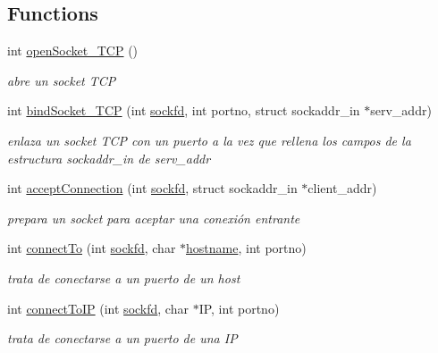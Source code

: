 \subsection*{Functions}
\begin{DoxyCompactItemize}
\item 
int \hyperlink{_g-2301-05-_p1-socket_8h_ac0a294efde364937332533e4ecd8d121}{open\-Socket\-\_\-\-T\-C\-P} ()
\begin{DoxyCompactList}\small\item\em abre un socket T\-C\-P \end{DoxyCompactList}\item 
int \hyperlink{_g-2301-05-_p1-socket_8h_a5ebfd6c6e35ddca1d74ca6a323cbab3e}{bind\-Socket\-\_\-\-T\-C\-P} (int \hyperlink{_g-2301-05-_p2-user_tools_8h_ad2c8fb3df3a737e0685e902870a611d2}{sockfd}, int portno, struct sockaddr\-\_\-in $\ast$serv\-\_\-addr)
\begin{DoxyCompactList}\small\item\em enlaza un socket T\-C\-P con un puerto a la vez que rellena los campos de la estructura sockaddr\-\_\-in de serv\-\_\-addr \end{DoxyCompactList}\item 
int \hyperlink{_g-2301-05-_p1-socket_8h_ae610867398c76f4226d89666d2e2646e}{accept\-Connection} (int \hyperlink{_g-2301-05-_p2-user_tools_8h_ad2c8fb3df3a737e0685e902870a611d2}{sockfd}, struct sockaddr\-\_\-in $\ast$client\-\_\-addr)
\begin{DoxyCompactList}\small\item\em prepara un socket para aceptar una conexión entrante \end{DoxyCompactList}\item 
int \hyperlink{_g-2301-05-_p1-socket_8h_a688c9a3a3e37e99d810e8ad63984272d}{connect\-To} (int \hyperlink{_g-2301-05-_p2-user_tools_8h_ad2c8fb3df3a737e0685e902870a611d2}{sockfd}, char $\ast$\hyperlink{servidor___i_r_c_8c_af203df082d5c6dcaa0c88b07cf86466d}{hostname}, int portno)
\begin{DoxyCompactList}\small\item\em trata de conectarse a un puerto de un host \end{DoxyCompactList}\item 
int \hyperlink{_g-2301-05-_p1-socket_8h_a073081b694c616f3485110ff67b6cc5a}{connect\-To\-I\-P} (int \hyperlink{_g-2301-05-_p2-user_tools_8h_ad2c8fb3df3a737e0685e902870a611d2}{sockfd}, char $\ast$I\-P, int portno)
\begin{DoxyCompactList}\small\item\em trata de conectarse a un puerto de una I\-P \end{DoxyCompactList}\item 

\end{DoxyCompactItemize}
